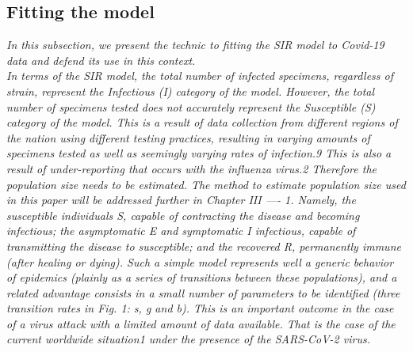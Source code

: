 \documentclass[final,a4paper,reqno]{elsarticle}
\numberwithin{equation}{section}
\begin{document}
\subsection{ Fitting the model}
\textit{
In this subsection, we present the technic to fitting the SIR model to Covid-19 data and defend its use in this context. \\
In terms of the SIR model, the total number of infected specimens, regardless of
strain, represent the Infectious (I) category of the model. However, the total number of
specimens tested does not accurately represent the Susceptible (S) category of the model.
This is a result of data collection from different regions of the nation using different
testing practices, resulting in varying amounts of specimens tested as well as seemingly
varying rates of infection.9 This is also a result of under-reporting that occurs with the
influenza virus.2 Therefore the population size needs to be estimated. The method to
estimate population size used in this paper will be addressed further in Chapter III ----
1. Namely, the susceptible individuals S, capable of contracting
the disease and becoming infectious; the asymptomatic E and
symptomatic I infectious, capable of transmitting the disease to
susceptible; and the recovered R, permanently immune (after
healing or dying). Such a simple model represents well a
generic behavior of epidemics (plainly as a series of transitions
between these populations), and a related advantage consists in
a small number of parameters to be identified (three transition
rates in Fig. 1: s, g and b). This is an important outcome
in the case of a virus attack with a limited amount of data
available. That is the case of the current worldwide situation1
under the presence of the SARS-CoV-2 virus.
}
\end{document}
